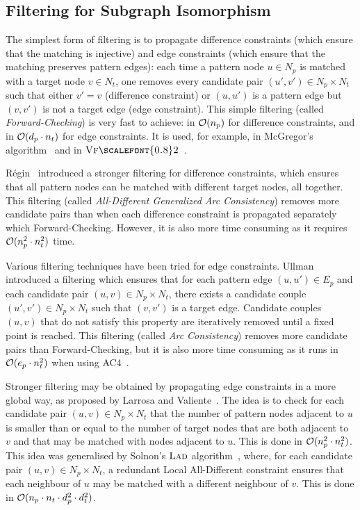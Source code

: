 \documentclass{llncs}
\newcommand{\VFtwo}{$\textsc{Vf{\scalefont{0.8}2}}$\xspace}
\newcommand{\LAD}{$\textsc{Lad}$\xspace}
\begin{document}
\subsection{Filtering for Subgraph Isomorphism}

The simplest form of filtering is to propagate difference constraints (which ensure that the
matching is injective) and edge constraints (which ensure that the matching preserves pattern
edges): each time a pattern node $u\in N_p$ is matched with a target node $v\in N_t$, one removes
every candidate pair $(u',v')\in N_p\times N_t$ such that either $v'=v$ (difference constraint) or
$(u,u')$ is a pattern edge but $(v,v')$ is not a target edge (edge constraint). This simple
filtering (called \emph{Forward-Checking}) is very fast to achieve: in ${\cal O}(n_p)$ for
difference constraints, and in ${\cal O}(d_p\cdot n_t)$ for edge constraints. It is used, for
example, in McGregor's algorithm~\cite{mcgregor79} and in \VFtwo{}~\cite{Cordella:2004}.

R\'egin~\cite{regin} introduced a stronger filtering for difference constraints, which ensures that
all pattern nodes can be matched with different target nodes, all together. This filtering (called
\emph{All-Different Generalized Arc Consistency}) removes more candidate pairs than when each
difference constraint is propagated separately which Forward-Checking. However, it is also more time
consuming as it requires ${\cal O}(n_p^2\cdot n_t^2)$ time.

Various filtering techniques have been tried for edge constraints. Ullman~\cite{ullman} introduced a
filtering which ensures that for each pattern edge $(u,u')\in E_p$ and each candidate pair $(u,v)\in
N_p\times N_t$, there exists a candidate couple $(u',v')\in N_p\times N_t$ such that $(v,v')$ is a
target edge. Candidate couples $(u,v)$ that do not satisfy this property are iteratively removed
until a fixed point is reached. This filtering (called \emph{Arc Consistency}) removes more
candidate pairs than Forward-Checking, but it is also more time consuming as it
runs in ${\cal
O}(e_p\cdot n_t^2)$ when using AC4~\cite{MH86}.

Stronger filtering may be obtained by propagating edge constraints in a more global way, as proposed
by Larrosa and Valiente~\cite{LV02}. The idea is to check for each candidate pair $(u,v)\in
N_p\times N_t$ that the number of pattern nodes adjacent to $u$ is smaller than or equal to the
number of target nodes that are both adjacent to $v$ and that may be matched with nodes adjacent to
$u$. This is done in ${\cal O}(n_p^2\cdot n_t^2)$. This idea was generalised by
Solnon's \LAD algorithm~\cite{Solnon:2010}, where, for each candidate pair $(u,v)\in N_p\times N_t$, a redundant Local
All-Different constraint ensures that each neighbour of $u$ may be matched with a different
neighbour of $v$. This is done in ${\cal O}(n_p\cdot n_t\cdot d_p^2\cdot d_t^2)$.
\end{document}
